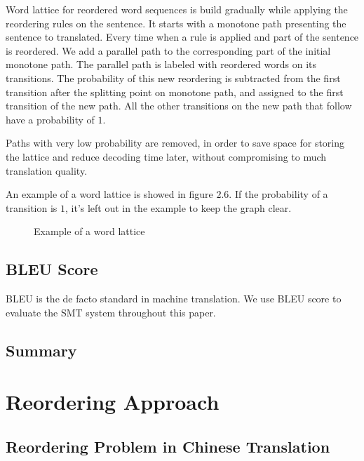 Word lattice for reordered word sequences is build gradually while applying the reordering rules on the sentence. It starts with a monotone path presenting the sentence to translated. Every time when a rule is applied and part of the sentence is reordered. We add a parallel path to the corresponding part of the initial monotone path. The parallel path is labeled with reordered words on its transitions. The probability of this new reordering is subtracted from the first transition after the splitting point on monotone path, and assigned to the first transition of the new path. All the other transitions on the new path that follow have a probability of $1$.


Paths with very low probability are removed, in order to save space for storing the lattice and reduce decoding time later, without compromising to much translation quality. %

An example of a word lattice is showed in figure $2.6$. If the probability of a transition is $1$, it's left out in the example to keep the graph clear.


\begin{landscape}
\begin{figure}
\centering

\caption{Example of a word lattice}
\end{figure}
\end{landscape}

\section{BLEU Score}
\label{ch:Foundations:sec:bleu}
BLEU is the de facto standard in machine translation\cite{metrics}. We use BLEU score to evaluate the SMT system throughout this paper.


\section{Summary}

\chapter{Reordering Approach}
\label{ch:ReorderingApproach}

\section{Reordering Problem in Chinese Translation}
\label{ch:ReorderingApproach:sec:Problem}

